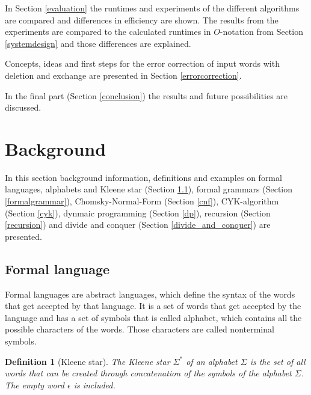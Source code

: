\documentclass[a4paper, 11pt]{article}
\newtheorem*{definition*}{Definition}
\begin{document}
In Section \ref{evaluation} the runtimes and experiments of the different algorithms are compared and differences in efficiency are shown. The results from the experiments are compared to the calculated runtimes in $O$-notation from Section \ref{systemdesign} and those differences are explained.

Concepts, ideas and first steps for the error correction of input words with deletion and exchange are presented in Section \ref{errorcorrection}.


In the final part (Section \ref{conclusion}) the results and future possibilities are discussed.




\pagebreak














\section{Background}

In this section background information, definitions and examples on formal languages, alphabets and Kleene star (Section \ref{formallanguage}), formal grammars (Section \ref{formalgrammar}), Chomsky-Normal-Form (Section \ref{cnf}), CYK-algorithm (Section \ref{cyk}), dynmaic programming (Section \ref{dp}), recursion (Section \ref{recursion}) and divide and conquer (Section \ref{divide_and_conquer}) are presented. 


\subsection{Formal language}
\label{formallanguage}


Formal languages are abstract languages, which define the syntax of the words that get accepted by that language. It is a set of words that get accepted by the language and has a set of symbols that is called alphabet, which contains all the possible characters of the words. Those characters are called nonterminal symbols. \cite{CNF, language}

\begin{definition*}[Kleene star]
The Kleene star $\Sigma^*$ of an alphabet $\Sigma$ is the set of all words that can be created through concatenation of the symbols of the alphabet $\Sigma$. The empty word $\epsilon$ is included. 
\end{definition*}
\end{document}
